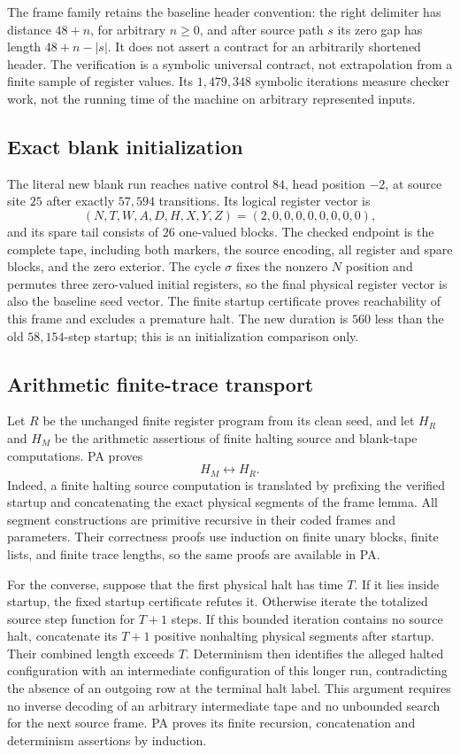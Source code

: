 The frame family retains the baseline header convention: the right
delimiter has distance $48+n$, for arbitrary $n\ge0$, and after source
path $s$ its zero gap has length $48+n-|s|$.  It does not assert a contract
for an arbitrarily shortened header.  The verification is a symbolic
universal contract, not extrapolation from a finite sample of register
values.  Its $1,479,348$ symbolic iterations measure checker work, not
the running time of the machine on arbitrary represented inputs.

\subsection{Exact blank initialization}

The literal new blank run reaches native control $84$, head position $-2$,
at source site $25$ after exactly $57,594$ transitions.  Its logical
register vector is
\[
 (N,T,W,A,D,H,X,Y,Z)=(2,0,0,0,0,0,0,0,0),
\]
and its spare tail consists of $26$ one-valued blocks.  The checked endpoint
is the complete tape, including both markers, the source encoding, all
register and spare blocks, and the zero exterior.  The cycle $\sigma$ fixes
the nonzero $N$ position and permutes three zero-valued initial registers,
so the final physical register vector is also the baseline seed vector.
The finite startup certificate proves reachability of this frame and
excludes a premature halt.  The new duration is $560$ less than the old
$58,154$-step startup; this is an initialization comparison only.

\subsection{Arithmetic finite-trace transport}

Let $R$ be the unchanged finite register program from its clean seed, and
let $H_R$ and $H_M$ be the arithmetic assertions of finite halting source
and blank-tape computations.  PA proves
\[
                         H_M\leftrightarrow H_R.
\]
Indeed, a finite halting source computation is translated by prefixing
the verified startup and concatenating the exact physical segments of
the frame lemma.  All segment constructions are primitive recursive in
their coded frames and parameters.  Their correctness proofs use
induction on finite unary blocks, finite lists, and finite trace lengths,
so the same proofs are available in PA.

For the converse, suppose that the first physical halt has time $T$.
If it lies inside startup, the fixed startup certificate refutes it.
Otherwise iterate the totalized source step function for $T+1$ steps.
If this bounded iteration contains no source halt, concatenate its
$T+1$ positive nonhalting physical segments after startup.  Their combined
length exceeds $T$.  Determinism then identifies the alleged halted
configuration with an intermediate configuration of this longer run,
contradicting the absence of an outgoing row at the terminal halt label.
This argument requires no inverse decoding of an arbitrary intermediate
tape and no unbounded search for the next source frame.  PA proves its
finite recursion, concatenation and determinism assertions by induction.

